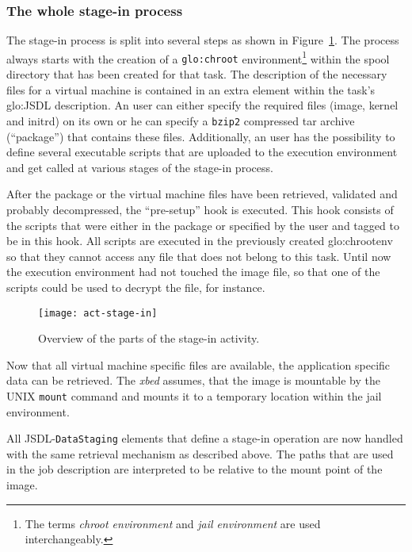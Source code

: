 \subsubsection{The whole stage-in process}

The  stage-in   process  is   split  into  several   steps  as   shown  in
Figure~\ref{fig:act-stage-in}. The process always starts with the creation
of a \texttt{\gls{glo:chroot}} environment\footnote{The terms \emph{chroot
    environment}  and \emph{jail  environment} are  used interchangeably.}
within  the spool  directory that  has been  created for  that  task.  The
description of the  necessary files for a virtual  machine is contained in
an extra element within the task's \gls{glo:JSDL} description. An user can
either specify the required files (image, kernel and initrd) on its own or
he can specify a  \texttt{bzip2} compressed tar archive (``package'') that
contains these files.  Additionally, an user has the possibility to define
several executable scripts that  are uploaded to the execution environment
and get called at various stages of the stage-in process.

After  the package  or  the  virtual machine  files  have been  retrieved,
validated and  probably decompressed, the ``pre-setup''  hook is executed.
This  hook consists  of the  scripts that  were either  in the  package or
specified  by the user  and tagged  to be  in this  hook. All  scripts are
executed in the previously created \gls{glo:chrootenv} so that they cannot
access any file that does not belong to this task. Until now the execution
environment had  not touched the  image file, so  that one of  the scripts
could be used to decrypt the file, for instance.

\begin{figure}[ht]
  \centering
  \texttt{[image: act-stage-in]}
  \caption[Stage-In  Activity]{Overview  of  the  parts  of  the  stage-in
    activity.}
  \label{fig:act-stage-in}
\end{figure}

Now that all virtual machine specific files are available, the application
specific data can be retrieved. The \emph{xbed} assumes, that the image is
mountable by the UNIX \texttt{mount}  command and mounts it to a temporary
location within the jail environment.

All  JSDL-\texttt{DataStaging} elements that  define a  stage-in operation
are now handled with the  same retrieval mechanism as described above. The
paths that are used in the  job description are interpreted to be relative
to the mount point of the image.

